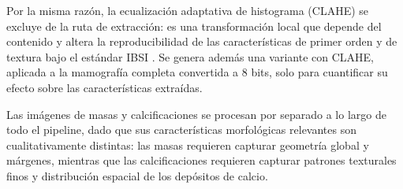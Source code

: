 Por la misma razón, la ecualización adaptativa de histograma (CLAHE) \cite{reza2004realization} se excluye de la ruta de
extracción: es una transformación local que depende del contenido y altera la reproducibilidad de las
características de primer orden y de textura bajo el estándar IBSI%
. Se genera además una variante con CLAHE, aplicada a la mamografía completa convertida a 8 bits, solo para
cuantificar su efecto sobre las características extraídas.

Las imágenes de masas y calcificaciones se procesan por
separado a lo largo de todo el pipeline, dado que sus
características morfológicas relevantes son
cualitativamente distintas: las masas requieren capturar
geometría global y márgenes, mientras que las
calcificaciones requieren capturar patrones texturales
finos y distribución espacial de los depósitos de calcio.

